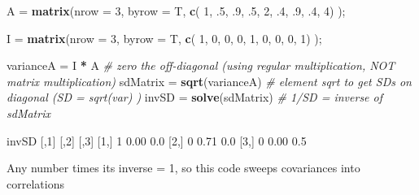 \documentclass[11pt,]{article}
\newenvironment{Shaded}{\begin{snugshade}}{\end{snugshade}}
\newcommand{\KeywordTok}[1]{\textcolor[rgb]{0.13,0.29,0.53}{\textbf{#1}}}
\newcommand{\DataTypeTok}[1]{\textcolor[rgb]{0.13,0.29,0.53}{#1}}
\newcommand{\DecValTok}[1]{\textcolor[rgb]{0.00,0.00,0.81}{#1}}
\newcommand{\FloatTok}[1]{\textcolor[rgb]{0.00,0.00,0.81}{#1}}
\newcommand{\StringTok}[1]{\textcolor[rgb]{0.31,0.60,0.02}{#1}}
\newcommand{\CommentTok}[1]{\textcolor[rgb]{0.56,0.35,0.01}{\textit{#1}}}
\newcommand{\OperatorTok}[1]{\textcolor[rgb]{0.81,0.36,0.00}{\textbf{#1}}}
\newcommand{\NormalTok}[1]{#1}
\begin{document}
\begin{Shaded}
\begin{Highlighting}[]
    
\NormalTok{A =}\StringTok{ }\KeywordTok{matrix}\NormalTok{(}\DataTypeTok{nrow =} \DecValTok{3}\NormalTok{, }\DataTypeTok{byrow =}\NormalTok{ T, }\KeywordTok{c}\NormalTok{(}
     \DecValTok{1}\NormalTok{, .}\DecValTok{5}\NormalTok{, .}\DecValTok{9}\NormalTok{,}
\NormalTok{    .}\DecValTok{5}\NormalTok{,  }\DecValTok{2}\NormalTok{, .}\DecValTok{4}\NormalTok{,}
\NormalTok{    .}\DecValTok{9}\NormalTok{, .}\DecValTok{4}\NormalTok{,  }\DecValTok{4}\NormalTok{)}
\NormalTok{);}

\NormalTok{I =}\StringTok{ }\KeywordTok{matrix}\NormalTok{(}\DataTypeTok{nrow =} \DecValTok{3}\NormalTok{, }\DataTypeTok{byrow =}\NormalTok{ T, }\KeywordTok{c}\NormalTok{(}
    \DecValTok{1}\NormalTok{,  }\DecValTok{0}\NormalTok{, }\DecValTok{0}\NormalTok{,}
    \DecValTok{0}\NormalTok{,  }\DecValTok{1}\NormalTok{, }\DecValTok{0}\NormalTok{,}
    \DecValTok{0}\NormalTok{,  }\DecValTok{0}\NormalTok{, }\DecValTok{1}\NormalTok{)}
\NormalTok{); }

\NormalTok{varianceA =}\StringTok{ }\NormalTok{I }\OperatorTok{*}\StringTok{ }\NormalTok{A }\CommentTok{# zero the off-diagonal (using regular multiplication, NOT matrix multiplication)}
\NormalTok{sdMatrix  =}\StringTok{ }\KeywordTok{sqrt}\NormalTok{(varianceA) }\CommentTok{# element sqrt to get SDs on diagonal (SD = sqrt(var) )}
\NormalTok{invSD     =}\StringTok{ }\KeywordTok{solve}\NormalTok{(sdMatrix) }\CommentTok{# 1/SD = inverse of sdMatrix}

\NormalTok{invSD}
\NormalTok{     [,}\DecValTok{1}\NormalTok{] [,}\DecValTok{2}\NormalTok{] [,}\DecValTok{3}\NormalTok{]}
\NormalTok{[}\DecValTok{1}\NormalTok{,]    }\DecValTok{1} \FloatTok{0.00}  \FloatTok{0.0}
\NormalTok{[}\DecValTok{2}\NormalTok{,]    }\DecValTok{0} \FloatTok{0.71}  \FloatTok{0.0}
\NormalTok{[}\DecValTok{3}\NormalTok{,]    }\DecValTok{0} \FloatTok{0.00}  \FloatTok{0.5}
\end{Highlighting}
\end{Shaded}

Any number times its inverse = 1, so this code sweeps covariances into
correlations

\begin{Shaded}
\end{Shaded}
\end{document}
